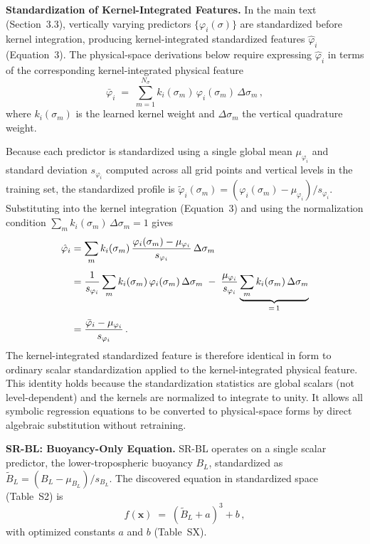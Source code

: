 \vspace{0.5em}
\textbf{Standardization of Kernel-Integrated Features.}
In the main text (Section~3.3), vertically varying predictors
$\{\varphi_i(\sigma)\}$ are standardized before kernel integration, producing
kernel-integrated standardized features $\hat{\varphi}_i$ (Equation~3).  The
physical-space derivations below require expressing $\hat{\varphi}_i$ in terms
of the corresponding kernel-integrated physical feature
%
\begin{equation}
  \bar{\varphi}_i \;=\; \sum_{m=1}^{N_\sigma}
    k_i(\sigma_m)\,\varphi_i(\sigma_m)\,\Delta\sigma_m\,,
  \label{eq:s-phys-ki}
\end{equation}
%
where $k_i(\sigma_m)$ is the learned kernel weight and $\Delta\sigma_m$ the
vertical quadrature weight.

Because each predictor is standardized using a single global mean
$\mu_{\varphi_i}$ and standard deviation $s_{\varphi_i}$ computed across all
grid points and vertical levels in the training set, the standardized profile
is $\tilde{\varphi}_i(\sigma_m) = (\varphi_i(\sigma_m) -
\mu_{\varphi_i})/s_{\varphi_i}$.  Substituting into the kernel integration
(Equation~3) and using the normalization condition $\sum_m k_i(\sigma_m)\,
\Delta\sigma_m = 1$ gives
%
\begin{align}
  \hat{\varphi}_i
    &= \sum_{m} k_i(\sigma_m)\,
       \frac{\varphi_i(\sigma_m) - \mu_{\varphi_i}}{s_{\varphi_i}}
       \,\Delta\sigma_m \notag\\[4pt]
    &= \frac{1}{s_{\varphi_i}}\sum_{m} k_i(\sigma_m)\,
       \varphi_i(\sigma_m)\,\Delta\sigma_m
       \;-\; \frac{\mu_{\varphi_i}}{s_{\varphi_i}}\underbrace{%
       \sum_{m} k_i(\sigma_m)\,\Delta\sigma_m}_{=\,1} \notag\\[4pt]
    &= \frac{\bar{\varphi}_i - \mu_{\varphi_i}}{s_{\varphi_i}}\,.
  \label{eq:s-ki-standardize}
\end{align}
%
The kernel-integrated standardized feature is therefore identical in form to
ordinary scalar standardization applied to the kernel-integrated physical
feature.  This identity holds because the standardization statistics are global
scalars (not level-dependent) and the kernels are normalized to integrate to
unity.  It allows all symbolic regression equations to be converted to
physical-space forms by direct algebraic substitution without retraining.

\vspace{1.0em}
\textbf{SR-BL: Buoyancy-Only Equation.}
SR-BL operates on a single scalar predictor, the lower-tropospheric buoyancy
$B_L$, standardized as $\tilde{B}_L = (B_L - \mu_{B_L})/s_{B_L}$.  The
discovered equation in standardized space (Table~S2) is
%
\begin{equation}
  f(\mathbf{x}) \;=\; (\tilde{B}_L + a)^3 + b\,,
  \label{eq:s-srbl-std}
\end{equation}
%
with optimized constants $a$ and $b$ (Table~SX).

